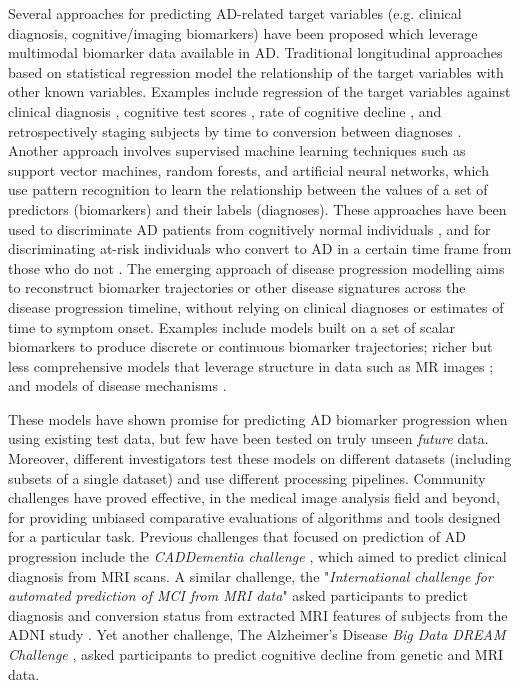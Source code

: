 Several approaches for predicting AD-related target variables (e.g. clinical diagnosis, cognitive/imaging biomarkers) have been proposed which leverage multimodal biomarker data available in AD. Traditional longitudinal approaches based on statistical regression model the relationship of the target variables with other known variables. Examples include regression of the target variables against clinical diagnosis \cite{scahill2002mapping}, cognitive test scores \cite{yang2011quantifying, sabuncu2011dynamics}, rate of cognitive decline \cite{doody2010predicting}, and retrospectively staging subjects by time to conversion between diagnoses \cite{guerrero2016instantiated}. Another approach involves supervised machine learning techniques such as support vector machines, random forests, and artificial neural networks, which use pattern recognition to learn the relationship between the values of a set of predictors (biomarkers) and their labels (diagnoses). These approaches have been used to discriminate AD patients from cognitively normal individuals \cite{kloppel2008automatic, zhang2011multimodal}, and for discriminating at-risk individuals who convert to AD in a certain time frame from those who do not \cite{young2013accurate, mattila2011disease}. The emerging approach of disease progression modelling aims to reconstruct biomarker trajectories or other disease signatures across the disease progression timeline, without relying on clinical diagnoses or estimates of time to symptom onset. Examples include models built on a set of scalar biomarkers to produce discrete \cite{fonteijn2012event, young2014data} or continuous \cite{jedynak2012computational, donohue2014estimating, villemagne2013amyloid} biomarker trajectories; richer but less comprehensive models that leverage structure in data such as MR images \cite{durrleman2013toward, lorenzi2015disentangling, bilgel2016multivariate}; and models of disease mechanisms \cite{seeley2009neurodegenerative, zhou2012predicting, raj2012network, iturria2016early}.

These models have shown promise for predicting AD biomarker progression when using existing test data, but few have been tested on truly unseen \emph{future} data. Moreover, different investigators test these models on different datasets (including subsets of a single dataset) and use different processing pipelines. Community challenges have proved effective, in the medical image analysis field and beyond, for providing unbiased comparative evaluations of algorithms and tools designed for a particular task. Previous challenges that focused on prediction of AD progression include the \emph{CADDementia challenge} \cite{bron2015standardized}, which aimed to predict clinical diagnosis from MRI scans. A similar challenge, the "\emph{International challenge for automated prediction of MCI from MRI data}" \cite{sarica2018machine} asked participants to predict diagnosis and conversion status from extracted MRI features of subjects from the ADNI study \cite{weiner2017recent}. Yet another challenge, The Alzheimer's Disease \emph{Big Data DREAM Challenge} \cite{allen2016crowdsourced}, asked participants to predict cognitive decline from genetic and MRI data. 


